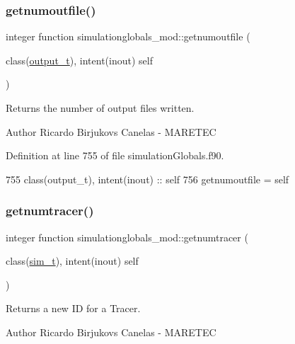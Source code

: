 \subsubsection{\texorpdfstring{getnumoutfile()}{getnumoutfile()}}
{\footnotesize\ttfamily integer function simulationglobals\+\_\+mod\+::getnumoutfile (\begin{DoxyParamCaption}\item[{class(\mbox{\hyperlink{structsimulationglobals__mod_1_1output__t}{output\+\_\+t}}), intent(inout)}]{self }\end{DoxyParamCaption})\hspace{0.3cm}{\ttfamily [private]}}



Returns the number of output files written. 

\begin{DoxyAuthor}{Author}
Ricardo Birjukovs Canelas -\/ M\+A\+R\+E\+T\+EC 
\end{DoxyAuthor}


Definition at line 755 of file simulation\+Globals.\+f90.


\begin{DoxyCode}
755     \textcolor{keywordtype}{class}(output\_t), \textcolor{keywordtype}{intent(inout)} :: self
756     getnumoutfile = self%
\end{DoxyCode}
\mbox{\label{namespacesimulationglobals__mod_ac4915156236196940b31ff02d53af295}} 
\subsubsection{\texorpdfstring{getnumtracer()}{getnumtracer()}}
{\footnotesize\ttfamily integer function simulationglobals\+\_\+mod\+::getnumtracer (\begin{DoxyParamCaption}\item[{class(\mbox{\hyperlink{structsimulationglobals__mod_1_1sim__t}{sim\+\_\+t}}), intent(inout)}]{self }\end{DoxyParamCaption})\hspace{0.3cm}{\ttfamily [private]}}



Returns a new ID for a Tracer. 

\begin{DoxyAuthor}{Author}
Ricardo Birjukovs Canelas -\/ M\+A\+R\+E\+T\+EC 
\end{DoxyAuthor}


